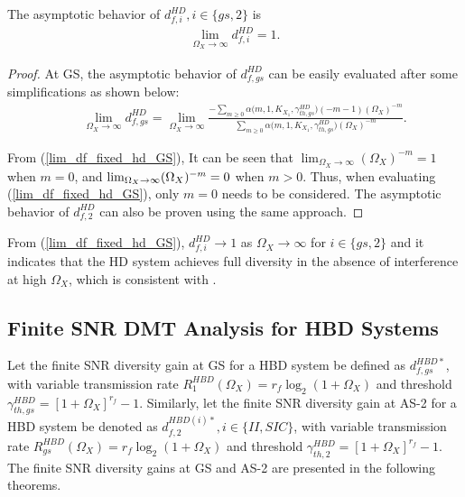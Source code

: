 \begin{corollary}
The asymptotic behavior of $d_{f,i}^{HD}, i \in \{gs,2\}$ is
\begin{eqnarray} \label{lim_df_fixed_hd}
\lim_{\Omega_X \to \infty} d_{f,i}^{HD} = 1. 
\end{eqnarray}
\end{corollary}
\begin{proof}
At GS, the asymptotic behavior of $d_{f,gs}^{HD}$ can be easily evaluated after some simplifications as shown below:
\begin{eqnarray} \label{lim_df_fixed_hd_GS}
&& \lim_{\Omega_X \to \infty} d_{f,gs}^{HD} = \lim_{\Omega_X \to \infty} \frac{ -\sum_{m\geq0} \alpha\big(m,1,K_{X_1},\gamma_{th,gs}^{HD}\big) (-m-1) (\Omega_{X})^{-m} }{\sum_{m\geq0} \alpha\big(m,1,K_{X_1},\gamma_{th,gs}^{HD}\big) (\Omega_{X})^{-m} }. 
\end{eqnarray}

From (\ref{lim_df_fixed_hd_GS}), It can be seen that $\lim_{\Omega_X\to\infty} (\Omega_{X})^{-m}=1 $ when $m=0$, and $\lim_{\Omega_X\to\infty} (\Omega_{X})^{-m} \\ = 0 $ when $m>0$. Thus, when evaluating (\ref{lim_df_fixed_hd_GS}), only $m=0$ needs to be considered. The asymptotic behavior of $d_{f,2}^{HD}$ can also be proven using the same approach.
\end{proof}


From (\ref{lim_df_fixed_hd_GS}), $d_{f,i}^{HD} \to 1$ as $\Omega_X \to \infty$ for $i \in \{gs,2\}$ and it indicates that the HD system achieves full diversity in the absence of interference at high $\Omega_X$, which is consistent with \cite[Fig. 3]{shin2008diversity}.

\subsection{Finite SNR DMT Analysis for HBD Systems}

Let the finite SNR diversity gain at GS for a HBD system be defined as $d_{f,gs}^{HBD*}$, with variable transmission rate $R_1^{HBD}(\Omega_X)=r_f\log_2(1+\Omega_X)$ and threshold $\gamma_{th,gs}^{HBD} = [1+\Omega_X]^{r_f}-1$. Similarly, let the finite SNR diversity gain at AS-2 for a HBD system be denoted as $d_{f,2}^{HBD(i)*}, i \in \{II,SIC\}$, with variable transmission rate $R_{gs}^{HBD}(\Omega_X)=r_f\log_2(1+\Omega_X)$ and threshold $\gamma_{th,2}^{HBD} = [1+\Omega_X]^{r_f}-1$. The finite SNR diversity gains at GS and AS-2 are presented in the following theorems.

